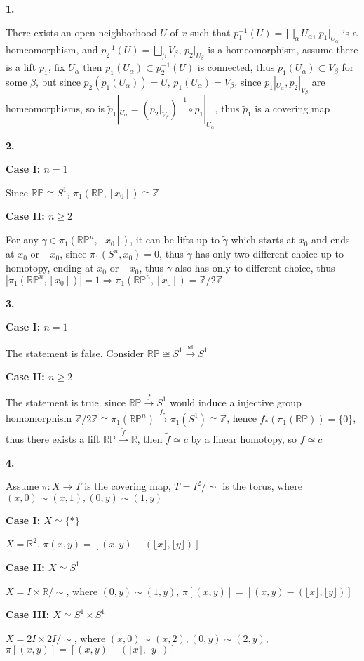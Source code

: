 \documentclass[12pt]{article}
\begin{document}
\textbf{1.} \par
There exists an open neighborhood $U$ of $x$ such that $p_{1}^{-1}(U)=\displaystyle\bigsqcup_{\alpha}U_{\alpha}$, $p_{1}|_{U_{\alpha}}$ is a homeomorphism, and $p_{2}^{-1}(U)=\displaystyle\bigsqcup_{\beta}V_{\beta}$, $p_{2}|_{U_{\beta}}$ is a homeomorphism, assume there is a lift $\widetilde{p}_{1}$, fix $U_{\alpha}$ then $\widetilde{p}_{1}(U_{\alpha})\subset p_{2}^{-1}(U)$ is connected, thus $\widetilde{p}_{1}(U_{\alpha})\subset V_{\beta}$ for some $\beta$, but since $p_{2}\left(\widetilde{p}_{1}(U_{\alpha})\right)=U$, $\widetilde{p}_{1}(U_{\alpha})=V_{\beta}$, since $p_{1}|_{U_{\alpha}},p_{2}|_{V_{\beta}}$ are homeomorphisms, so is $\widetilde{p}_{1}|_{U_{\alpha}}=\left(p_{2}|_{V_{\beta}}\right)^{-1}\circ p_{1}|_{U_{\alpha}}$, thus $\widetilde{p}_{1}$ is a covering map \par
\textbf{2.} \par
\textbf{Case I: $n=1$} \par
Since $\mathbb{RP}\cong S^{1}$, $\pi_{1}(\mathbb{RP},[x_{0}])\cong\mathbb{Z}$ \par
\textbf{Case II: $n\geq 2$} \par
For any $\gamma\in\pi_{1}(\mathbb{RP}^{n},[x_{0}])$, it can be lifts up to $\widetilde{\gamma}$ which starts at $x_{0}$ and ends at $x_{0}$ or $-x_{0}$, since $\pi_{1}(S^{n},x_{0})=0$, thus $\widetilde{\gamma}$ has only two different choice up to homotopy, ending at $x_{0}$ or $-x_{0}$, thus $\gamma$ also has only to different choice, thus $|\pi_{1}(\mathbb{RP}^{n},[x_{0}])|=1 \Rightarrow\pi_{1}(\mathbb{RP}^{n},[x_{0}])=\mathbb{Z}/2\mathbb{Z}$ \par
\textbf{3.} \par
\textbf{Case I: $n=1$} \par
The statement is false. Consider $\mathbb{RP}\cong S^{1}\xrightarrow{\mathrm{id}}S^{1}$ \par
\textbf{Case II: $n\geq 2$} \par
The statement is true. since $\mathbb{RP}\xrightarrow{f}S^{1}$ would induce a injective group homomorphism $\mathbb{Z}/2\mathbb{Z}\cong\pi_{1}(\mathbb{RP}^{n})\xrightarrow{f_{*}}\pi_1(S^1)\cong\mathbb{Z}$, hence $f_*(\pi_1(\mathbb{RP}))=\{0\}$, thus there exists a lift $\mathbb{RP}\xrightarrow{\widetilde{f}}\mathbb{R}$, then $\widetilde{f}\simeq c$ by a linear homotopy, so $f\simeq c$ \par
\textbf{4.} \par
Assume $\pi: X\rightarrow T$ is the covering map, $T=I^{2}/\sim$ is the torus, where $(x,0)\sim(x,1),(0,y)\sim(1,y)$ \par
\textbf{Case I: $X\simeq \{*\}$} \par
$X=\mathbb{R}^{2}$, $\pi(x,y)=\left[(x,y)-(\lfloor x\rfloor,\lfloor y\rfloor)\right]$ \par
\textbf{Case II: $X\simeq S^{1}$} \par
$X=I\times\mathbb{R}/\sim$, where $(0,y)\sim(1,y)$, $\pi[(x,y)]=\left[(x,y)-(\lfloor x\rfloor,\lfloor y\rfloor)\right]$ \par
\textbf{Case III: $X\simeq S^{1}\times S^{1}$} \par
$X=2I\times 2I/\sim$, where $(x,0)\sim(x,2), (0,y)\sim(2,y)$, $\pi[(x,y)]=\left[(x,y)-(\lfloor x\rfloor,\lfloor y\rfloor)\right]$ \par
\end{document}
